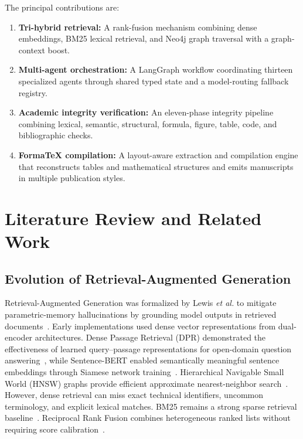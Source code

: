 \documentclass[conference]{IEEEtran}
\begin{document}
The principal contributions are:
\begin{enumerate}
\item \textbf{Tri-hybrid retrieval:} A rank-fusion mechanism combining dense embeddings, BM25 lexical retrieval, and Neo4j graph traversal with a graph-context boost.
\item \textbf{Multi-agent orchestration:} A LangGraph workflow coordinating thirteen specialized agents through shared typed state and a model-routing fallback registry.
\item \textbf{Academic integrity verification:} An eleven-phase integrity pipeline combining lexical, semantic, structural, formula, figure, table, code, and bibliographic checks.
\item \textbf{FormaTeX compilation:} A layout-aware extraction and compilation engine that reconstructs tables and mathematical structures and emits manuscripts in multiple publication styles.
\end{enumerate}

\section{Literature Review and Related Work}
\subsection{Evolution of Retrieval-Augmented Generation}
Retrieval-Augmented Generation was formalized by Lewis \textit{et al.} to mitigate parametric-memory hallucinations by grounding model outputs in retrieved documents~\cite{lewis2020rag}. Early implementations used dense vector representations from dual-encoder architectures. Dense Passage Retrieval (DPR) demonstrated the effectiveness of learned query--passage representations for open-domain question answering~\cite{karpukhin2020dpr}, while Sentence-BERT enabled semantically meaningful sentence embeddings through Siamese network training~\cite{reimers2019sbert}. Hierarchical Navigable Small World (HNSW) graphs provide efficient approximate nearest-neighbor search~\cite{malkov2020hnsw}. However, dense retrieval can miss exact technical identifiers, uncommon terminology, and explicit lexical matches. BM25 remains a strong sparse retrieval baseline~\cite{robertson2009bm25}. Reciprocal Rank Fusion combines heterogeneous ranked lists without requiring score calibration~\cite{cormack2009rrf}.
\end{document}
